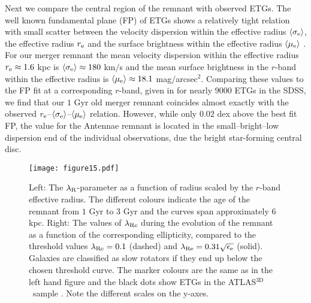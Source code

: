 \documentclass[a4paper,fleqn,usenatbib]{mnras}
\newcommand{\atlas}{\textsc{ATLAS$^\mathrm{3D}$}}
\begin{document}
Next we compare the central region of the remnant with 
observed ETGs. The well known fundamental plane (FP) of ETGs shows a relatively tight relation with small scatter
between the velocity dispersion within the effective radius $\langle\sigma_{\rm{e}}\rangle$, the effective radius $r_{\rm{e}}$ and 
the surface brightness within the effective radius $\langle \mu_{\rm{e}}\rangle$ 
\citep{1976ApJ...204..668F,1987ApJ...313...59D,2003AJ....125.1866B, 2006MNRAS.366.1126C}.
For our merger remnant the mean velocity
dispersion within the effective radius $r_{\rm{e}}\approx 1.6$ kpc is $\langle\sigma_{\rm{e}}\rangle\approx180$ km$/$s and the mean surface
brightness in the $r$-band within the effective radius is 
$\langle \mu_{\rm{e}}\rangle\approx18.1$ mag$/$arcsec$^2$. Comparing these values to the FP fit at a corresponding $r$-band, given
in \citet{2003AJ....125.1866B} for nearly $9000$ ETGs in the SDSS, we find that our $1$ Gyr old merger
remnant coincides almost exactly with the observed $r_{\rm{e}}$--$\langle\sigma_{\rm{e}}\rangle$--$\langle \mu_{\rm{e}}\rangle$ relation. 
However, while only $0.02$ dex above the best fit FP, the value for the Antennae remnant is located in the small--bright--low dispersion
end of the individual observations, due the bright star-forming central disc. 

\begin{figure*}
\centering
\texttt{[image: figure15.pdf]}
    \caption{Left: The $\lambda_{\rm{R}}$-parameter as a function of radius scaled by
    the $r$-band effective radius. The different colours indicate the age of 
    the remnant from $1$ Gyr to $3$ Gyr and the curves span approximately $6$ kpc. Right: The values of $\lambda_{\rm{Re}}$
    during the evolution of the remnant as a function of the corresponding ellipticity, 
    compared to the threshold values $\lambda_{\rm{Re}}=0.1$ (dashed) and 
    $\lambda_{\rm{Re}}=0.31\sqrt{\epsilon_{\rm{e}}}$ (solid). Galaxies are classified as slow rotators if they end
    up below the chosen threshold curve. The marker colours are the same
    as in the left hand figure and the black dots show ETGs in the \atlas\ sample \citep{2011MNRAS.414.2923K}.
    Note the different scales on the y-axes.}
    \label{fig:lambda_R}
\end{figure*}
\end{document}
